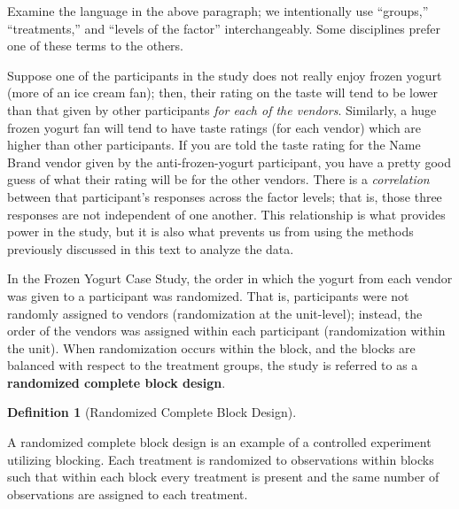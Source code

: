 \documentclass[
  letterpaper,
  DIV=11,
  numbers=noendperiod]{scrreprt}
\theoremstyle{plain}
\theoremstyle{definition}
\theoremstyle{definition}
\newtheorem{definition}{Definition}[chapter]
\theoremstyle{remark}
\begin{document}
\begin{tcolorbox}[enhanced jigsaw, breakable, titlerule=0mm, colframe=quarto-callout-note-color-frame, bottomtitle=1mm, opacityback=0, rightrule=.15mm, toptitle=1mm, arc=.35mm, bottomrule=.15mm, left=2mm, title=\textcolor{quarto-callout-note-color}{\faInfo}\hspace{0.5em}{Note}, leftrule=.75mm, coltitle=black, toprule=.15mm, colbacktitle=quarto-callout-note-color!10!white, colback=white, opacitybacktitle=0.6]

Examine the language in the above paragraph; we intentionally use
``groups,'' ``treatments,'' and ``levels of the factor''
interchangeably. Some disciplines prefer one of these terms to the
others.

\end{tcolorbox}

Suppose one of the participants in the study does not really enjoy
frozen yogurt (more of an ice cream fan); then, their rating on the
taste will tend to be lower than that given by other participants
\emph{for each of the vendors}. Similarly, a huge frozen yogurt fan will
tend to have taste ratings (for each vendor) which are higher than other
participants. If you are told the taste rating for the Name Brand vendor
given by the anti-frozen-yogurt participant, you have a pretty good
guess of what their rating will be for the other vendors. There is a
\emph{correlation} between that participant's responses across the
factor levels; that is, those three responses are not independent of one
another. This relationship is what provides power in the study, but it
is also what prevents us from using the methods previously discussed in
this text to analyze the data.

In the Frozen Yogurt Case Study, the order in which the yogurt from each
vendor was given to a participant was randomized. That is, participants
were not randomly assigned to vendors (randomization at the unit-level);
instead, the order of the vendors was assigned within each participant
(randomization within the unit). When randomization occurs within the
block, and the blocks are balanced with respect to the treatment groups,
the study is referred to as a \textbf{randomized complete block design}.

\begin{definition}[Randomized Complete Block
Design]\protect\hypertarget{def-rcbd}{}\label{def-rcbd}

A randomized complete block design is an example of a controlled
experiment utilizing blocking. Each treatment is randomized to
observations within blocks such that within each block every treatment
is present and the same number of observations are assigned to each
treatment.

\end{definition}
\end{document}
